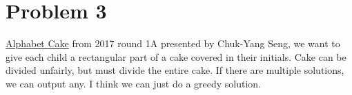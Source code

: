 \documentclass[11pt]{article} %
\begin{document}
\section*{Problem 3}
\href{https://code.google.com/codejam/contest/5304486/dashboard}{Alphabet Cake} from 2017 round 1A presented by Chuk-Yang Seng, we want to give each child a rectangular part of a cake covered in their initials. Cake can be divided unfairly, but must divide the entire cake. If there are multiple solutions, we can output any. I think we can just do a greedy solution.
\end{document}
